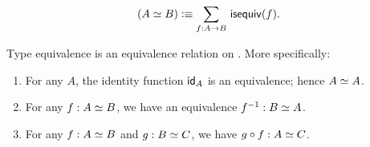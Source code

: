 \documentclass[hott-all.tex]{subfiles}
\begin{document}
%
\begin{equation}\label{eq:eqv}
  (\eqv A B) \defeq \sm{f:A\to B} \isequiv(f).
\end{equation}
%
%
\begin{lem}\label{thm:equiv-eqrel}
  Type equivalence is an equivalence relation on \type.
  More specifically:
  \begin{enumerate}
  \item For any $A$, the identity function $\idfunc[A]$ is an equivalence; hence $\eqv A A$.
  \item For any $f:\eqv A B$, we have an equivalence $f^{-1} : \eqv B A$.
  \item For any $f:\eqv A B$ and $g:\eqv B C$, we have $g\circ f : \eqv A C$.
  \end{enumerate}
\end{lem}
%
%
%
\end{document}
